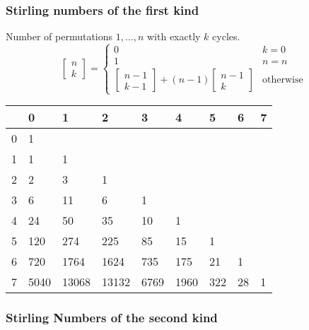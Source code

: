 \subsubsection{Stirling numbers of the first kind}
Number of permutations $1, \dots, n$ with exactly $k$ cycles.
\begin{equation*}
  \begin{bmatrix}
    n\\k
  \end{bmatrix} =
  \begin{cases}
    0 & k = 0\\
    1 & n = n\\
    \left[
      \begin{smallmatrix}
        n - 1\\k - 1
      \end{smallmatrix}
\right] + (n - 1) \left[
  \begin{smallmatrix}
    n-1\\k
  \end{smallmatrix}
\right] & \text{otherwise}
  \end{cases}
\end{equation*}

\begin{center}
	\begin{tabular}{ |l||l|l|l|l|l|l|l|l| } 
		\hline
		\diagbox{$n$}{$k$} & 0 & 1 & 2 & 3 & 4 & 5 & 6 & 7  \\
		\hline\hline
		0 &  1    &       &       &      &      &     &     &  \\
		1 &  1    & 1     &       &      &      &     &     &  \\
		2 &  2    & 3     & 1     &      &      &     &     &  \\
		3 &  6    & 11    & 6     & 1    &      &     &     &  \\
		4 &  24   & 50    & 35    & 10   & 1    &     &     &  \\
		5 &  120  & 274   & 225   & 85   & 15   & 1   &     &  \\
		6 &  720  & 1764  & 1624  & 735  & 175  & 21  & 1   &  \\
		7 &  5040 & 13068 & 13132 & 6769 & 1960 & 322 & 28 & 1 \\
		\hline
	\end{tabular}
\end{center}

\subsubsection{Stirling Numbers of the second kind}

